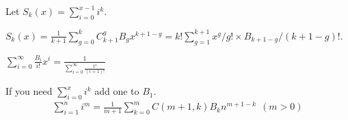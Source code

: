 Let $S_k(x)=\sum_{i=0}^{x-1}i^k$.\par
$S_k(x)=\frac{1}{k+1}\sum_{g=0}^k C_{k+1}^g B_g x^{k+1-g}=k!\sum_{g=1}^{k+1} x^g/g! \times B_{k+1-g}/(k+1-g)!$.\par
$\sum_{i=0}^{\infty} \frac{B_i}{i!}x^i=\frac{1}{\sum_{i=0}^{\infty}\frac{x^i}{(i+1)!}}$\par
If you need $\sum_{i=0}^x i^k$ add one to $B_1$.
\begin{eqnarray*}
\sum_{i=1}^n i^m=\frac{1}{m+1}\sum_{k=0}^mC(m+1,k)B_kn^{m+1-k}~~(m>0)
\end{eqnarray*}